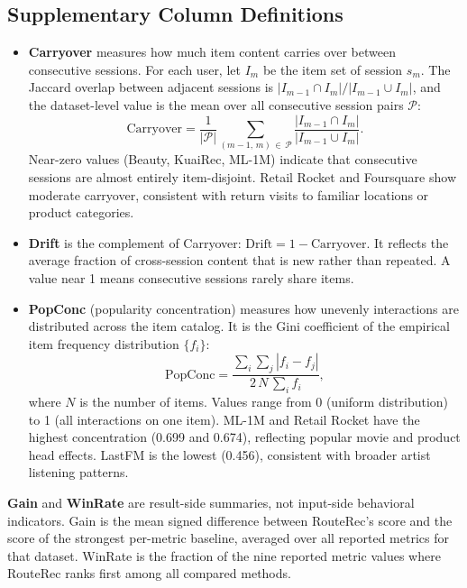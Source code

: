 \subsection{Supplementary Column Definitions}
\label{sec:b3}

\begin{itemize}
  \item \textbf{Carryover} measures how much item content carries over between consecutive sessions. For each user, let $I_m$ be the item set of session $s_m$. The Jaccard overlap between adjacent sessions is $|I_{m-1} \cap I_m| / |I_{m-1} \cup I_m|$, and the dataset-level value is the mean over all consecutive session pairs $\mathcal{P}$:
  \[
    \text{Carryover} = \frac{1}{|\mathcal{P}|} \sum_{(m-1,\,m)\,\in\,\mathcal{P}} \frac{|I_{m-1} \cap I_m|}{|I_{m-1} \cup I_m|}.
  \]
  Near-zero values (Beauty, KuaiRec, ML-1M) indicate that consecutive sessions are almost entirely item-disjoint. Retail Rocket and Foursquare show moderate carryover, consistent with return visits to familiar locations or product categories.

  \item \textbf{Drift} is the complement of Carryover: $\text{Drift} = 1 - \text{Carryover}$. It reflects the average fraction of cross-session content that is new rather than repeated. A value near 1 means consecutive sessions rarely share items.

  \item \textbf{PopConc} (popularity concentration) measures how unevenly interactions are distributed across the item catalog. It is the Gini coefficient of the empirical item frequency distribution $\{f_i\}$:
  \[
    \text{PopConc} = \frac{\sum_i \sum_j |f_i - f_j|}{2\,N\,\sum_i f_i},
  \]
  where $N$ is the number of items. Values range from 0 (uniform distribution) to 1 (all interactions on one item). ML-1M and Retail Rocket have the highest concentration (0.699 and 0.674), reflecting popular movie and product head effects. LastFM is the lowest (0.456), consistent with broader artist listening patterns.
\end{itemize}

\noindent\textbf{Gain} and \textbf{WinRate} are result-side summaries, not input-side behavioral indicators. Gain is the mean signed difference between RouteRec's score and the score of the strongest per-metric baseline, averaged over all reported metrics for that dataset. WinRate is the fraction of the nine reported metric values where RouteRec ranks first among all compared methods.

